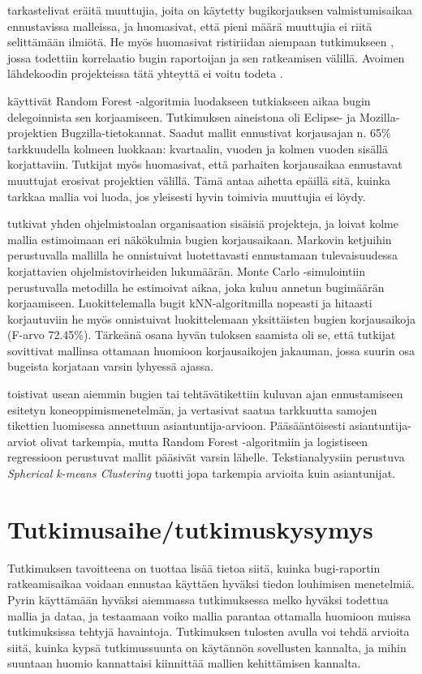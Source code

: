 \documentclass[utf8]{gradu3}
\begin{document}
\textcite{Bhattacharya-2011} tarkastelivat eräitä muuttujia, joita on käytetty
bugikorjauksen valmistumisaikaa ennustavissa malleissa, ja huomasivat, että
pieni määrä muuttujia ei riitä selittämään ilmiötä. He myös huomasivat
ristiriidan aiempaan tutkimukseen \parencite{Guo-2010}, jossa todettiin
korrelaatio bugin raportoijan ja sen ratkeamisen välillä. Avoimen lähdekoodin
projekteissa tätä yhteyttä ei voitu todeta \parencite{Bhattacharya-2011}.

\textcite{Marks-2011} käyttivät Random Forest -algoritmia luodakseen tutkiakseen
aikaa bugin delegoinnista sen korjaamiseen. Tutkimuksen aineistona oli Eclipse-
ja Mozilla-projektien Bugzilla-tietokannat. Saadut mallit ennustivat korjausajan
n. 65\% tarkkuudella kolmeen luokkaan: kvartaalin, vuoden ja kolmen vuoden
sisällä korjattaviin. Tutkijat myös huomasivat, että parhaiten korjausaikaa
ennustavat muuttujat erosivat projektien välillä. Tämä antaa aihetta epäillä
sitä, kuinka tarkkaa mallia voi luoda, jos yleisesti hyvin toimivia muuttujia ei
löydy.

\textcite{Zhang-2013} tutkivat yhden ohjelmistoalan organisaation sisäisiä
projekteja, ja loivat kolme mallia estimoimaan eri näkökulmia bugien
korjausaikaan. Markovin ketjuihin perustuvalla mallilla he onnistuivat
luotettavasti ennustamaan tulevaisuudessa korjattavien ohjelmistovirheiden
lukumäärän. Monte Carlo -simulointiin perustuvalla metodilla he estimoivat
aikaa, joka kuluu annetun bugimäärän korjaamiseen. Luokittelemalla bugit
kNN-algoritmilla nopeasti ja hitaasti korjautuviin he myös onnistuivat
luokittelemaan yksittäisten bugien korjausaikoja (F-arvo 72.45\%). Tärkeänä
osana hyvän tuloksen saamista oli se, että tutkijat sovittivat mallinsa ottamaan
huomioon korjausaikojen jakauman, jossa suurin osa bugeista korjataan varsin
lyhyessä ajassa.

\textcite{Pfahl-2016} toistivat usean aiemmin bugien tai tehtävätikettiin
kuluvan ajan ennustamiseen esitetyn koneoppimismenetelmän, ja vertasivat saatua
tarkkuutta samojen tikettien luomisessa annettuun asiantuntija-arvioon.
Pääsääntöisesti asiantuntija-arviot olivat tarkempia, mutta Random Forest
-algoritmiin ja logistiseen regressioon perustuvat mallit pääsivät varsin
lähelle. Tekstianalyysiin perustuva \textit{Spherical k-means Clustering} tuotti
jopa tarkempia arvioita kuin asiantunijat.


\parencite[][Esim.]{Lamkanfi-2012,ardimento-2020,lee-2020} %

\chapter{Tutkimusaihe/tutkimuskysymys}
Tutkimuksen tavoitteena on tuottaa lisää tietoa siitä, kuinka bugi-raportin
ratkeamisaikaa voidaan ennustaa käyttäen hyväksi tiedon louhimisen menetelmiä.
Pyrin käyttämään hyväksi aiemmassa tutkimuksessa \parencite{riivo-2016} melko
hyväksi todettua mallia ja dataa, ja testaamaan voiko mallia parantaa ottamalla
huomioon muissa tutkimuksissa tehtyjä havaintoja. Tutkimuksen tulosten avulla
voi tehdä arvioita siitä, kuinka kypsä tutkimussuunta on käytännön sovellusten
kannalta, ja mihin suuntaan huomio kannattaisi kiinnittää mallien kehittämisen
kannalta.
\end{document}
